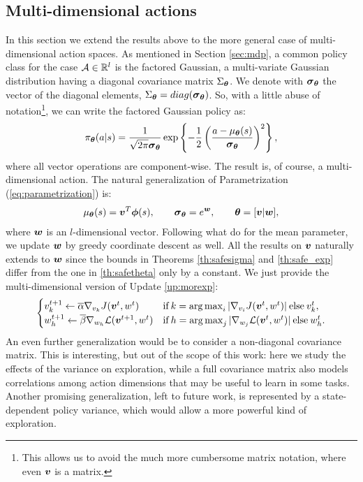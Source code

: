 \subsection{Multi-dimensional actions}\label{app:multi}
In this section we extend the results above to the more general case of multi-dimensional action spaces.
As mentioned in Section \ref{sec:mdp}, a common policy class for the case $\Aspace\in\mathbb{R}^l$ is the factored Gaussian, \ie a multi-variate Gaussian distribution having a diagonal covariance matrix $\Sigma_{\vtheta}$. We denote with $\vsigma_{\vtheta}$ the vector of the diagonal elements, \ie $\Sigma_{\vtheta} = \mathop{diag}(\vsigma_{\vtheta})$. So, with a little abuse of notation\footnote{This allows us to avoid the much more cumbersome matrix notation, where even $\vv$ is a matrix.}, we can write the factored Gaussian policy as:
\[
\pi_{\vtheta}(a\vert s) = \frac{1}{\sqrt{2\pi}\vsigma_{\vtheta}}\exp\left\{-\frac{1}{2}\left(\frac{a - \mu_{\vtheta}(s)}{\vsigma_{\vtheta}}\right)^2\right\},
\]
where all vector operations are component-wise. The result is, of course, a multi-dimensional action. The natural generalization of Parametrization (\ref{eq:parametrization}) is:
\begin{align}\label{eq:parametrization_multi}
\mu_{\vtheta}(s)=\vv^T\vphi(s), \qquad \vsigma_{\vtheta}=e^{\vw}, \qquad \vtheta=[\vv\vert \vw],
\end{align}
where $\vw$ is an $l$-dimensional vector. Following what \cite{adaptive_batch} do for the mean parameter, we update $\vw$ by greedy coordinate descent as well. All the results on $\vv$ naturally extends to $\vw$ since the bounds in Theorems \ref{th:safesigma} and \ref{th:safe_exp} differ from the one in \ref{th:safetheta} only by a constant. We just provide the multi-dimensional version of Update \ref{up:morexp}:
\begin{align*}
\begin{cases}
v_{k}^{t+1} \gets \overline{\alpha}\gradJ[v_{k}]{\vv^t,w^t}
& \text{if}\:k =  \argmax_i |\gradJ[v_i]{\vv^t, w^t}| \:\text{else}\:v_{k}^t,\\
w_h^{t+1} \gets \overline{\beta}\nabla_{w_h}\mathcal{L}(\vv^{t+1}, w^t)
& \text{if}\:h =  \argmax_j |\nabla_{w_j}\mathcal{L}(\vv^t, w^t)| \:\text{else}\:w_{h}^t.
\end{cases}
\end{align*}
An even further generalization would be to consider a non-diagonal covariance matrix. This is interesting, but out of the scope of this work: here we study the effects of the variance on exploration, while a full covariance matrix also models correlations among action dimensions that may be useful to learn in some tasks.
Another promising generalization, left to future work, is represented by a state-dependent policy variance, which would allow a more powerful kind of exploration.




